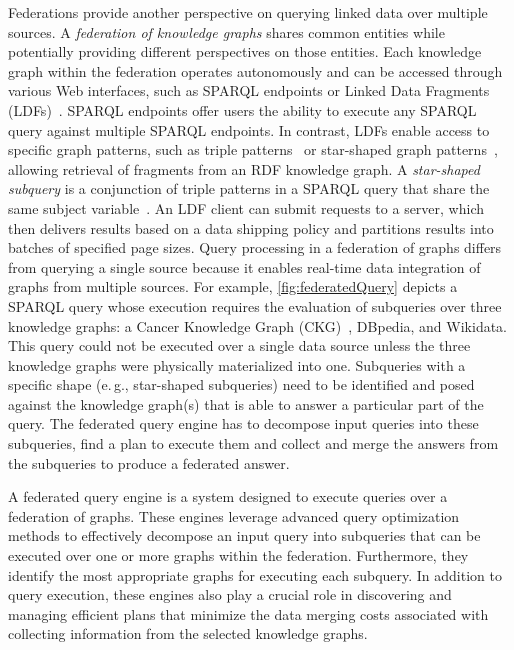\documentclass[a4paper,USenglish]{tgdk-v2021}
\begin{document}
Federations provide another perspective on querying linked data over multiple sources.
A \emph{federation of knowledge graphs} shares common entities while potentially providing different perspectives on those entities. 
Each knowledge graph within the federation operates autonomously and can be accessed through various Web interfaces, such as SPARQL endpoints or Linked Data Fragments (LDFs)~\cite{DBLP:journals/ws/VerborghSHHVMHC16}. 
SPARQL endpoints offer users the ability to execute any SPARQL query against multiple SPARQL endpoints.
In contrast, LDFs enable access to specific graph patterns, such as triple patterns~\cite{DBLP:conf/semweb/VerborghHMHVSCCMW14a} or star-shaped graph patterns~\cite{DBLP:journals/corr/abs-2002-09172}, allowing retrieval of fragments from an RDF knowledge graph.
A \emph{star-shaped subquery} is a conjunction of triple patterns in a SPARQL query that share the same subject variable~\cite{DBLP:conf/esws/VidalRLMSP10}.
An LDF client can submit requests to a server, which then delivers results based on a data shipping policy and partitions results into batches of specified page sizes.
Query processing in a federation of graphs differs from querying a single source because it enables real-time data integration of graphs from multiple sources.
For example, \autoref{fig:federatedQuery} depicts a SPARQL query whose execution requires the evaluation of subqueries over three knowledge graphs: a Cancer Knowledge Graph (CKG)~\cite{DBLP:journals/semweb/AisoposJNPRSIVM23}, DBpedia, and Wikidata.
This query could not be executed over a single data source unless the three knowledge graphs were physically materialized into one. Subqueries with a specific shape (e.\,g., star-shaped subqueries) need to be identified and posed against the knowledge graph(s) that is able to answer a particular part of the query. The federated query engine has to decompose input queries into these subqueries, find a plan to execute them and collect and merge the answers from the subqueries to produce a federated answer.

A federated query engine is a system designed to execute queries over a federation of graphs. 
These engines leverage advanced query optimization methods to effectively decompose an input query into subqueries that can be executed over one or more graphs within the federation. 
Furthermore, they identify the most appropriate graphs for executing each subquery.
In addition to query execution, these engines also play a crucial role in discovering and managing efficient plans that minimize the data merging costs associated with collecting information from the selected knowledge graphs.
\end{document}
